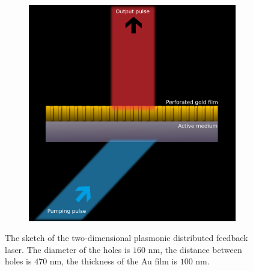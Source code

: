 \documentclass[aps,pra,amsmath,amssymb,onecolumn,superscriptaddress,showpacs,floatfix,]{revtex4-1}
\begin{document}
\begin{figure}[!h]
	\centering
	\begin{subfigure}[h]{0.6\linewidth}
		\includegraphics[width=\linewidth]{Fig1.png}
	\end{subfigure}
	\caption{The sketch of the two-dimensional plasmonic distributed feedback laser. The diameter of the holes is $160$ $\text{nm}$, the distance between holes is $470$ $\text{nm}$, the thickness of the Au film is $100$ $\text{nm}$.}
	\label{fig1}
\end{figure}
\end{document}
